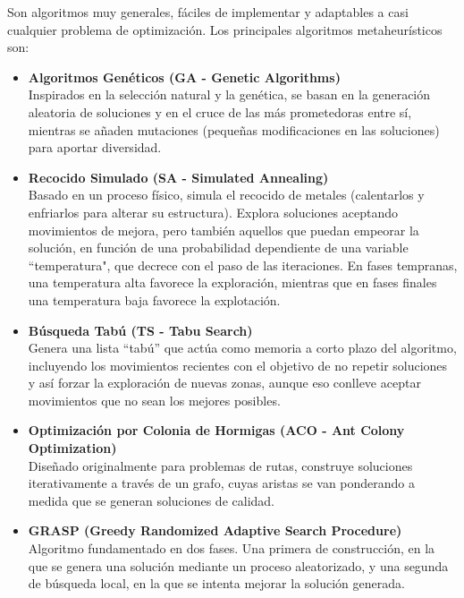 \documentclass[12pt,a4paper]{book}
\begin{document}
Son algoritmos muy generales, fáciles de implementar y adaptables a casi 
cualquier problema de optimización. Los principales algoritmos metaheurísticos son:
\begin{itemize}
    \item \textbf{Algoritmos Genéticos (GA - Genetic Algorithms)}\\
    Inspirados en la selección natural y la genética, se basan en la generación aleatoria de soluciones y en el cruce de las más prometedoras entre sí, 
    mientras se añaden mutaciones (pequeñas modificaciones en las soluciones) para aportar diversidad.
    
    \item \textbf{Recocido Simulado (SA - Simulated Annealing)}\\
    Basado en un proceso físico, simula el recocido de metales (calentarlos y enfriarlos para alterar su estructura). Explora soluciones aceptando movimientos de mejora, pero también aquellos que puedan empeorar la solución, 
    en función de una probabilidad dependiente de una variable ``temperatura", que decrece con el paso de las iteraciones. En fases tempranas, una temperatura alta favorece la exploración, mientras que en fases finales una temperatura baja favorece la explotación.
    
    \item \textbf{Búsqueda Tabú (TS - Tabu Search)}\\
    Genera una lista ``tabú'' que actúa como memoria a corto plazo del algoritmo, incluyendo los movimientos recientes con el objetivo de no repetir soluciones y así forzar la exploración de nuevas zonas, aunque eso conlleve aceptar movimientos que no sean los mejores posibles.
    
    \item \textbf{Optimización por Colonia de Hormigas (ACO - Ant Colony Optimization)}\\
    Diseñado originalmente para problemas de rutas, construye soluciones iterativamente a través de un grafo, cuyas aristas se van ponderando a medida que se generan soluciones de calidad.
    
    \item \textbf{GRASP (Greedy Randomized Adaptive Search Procedure)}\\
    Algoritmo fundamentado en dos fases. Una primera de construcción, en la que se genera una solución mediante un proceso aleatorizado, y una segunda de búsqueda local, en la que se intenta mejorar la solución generada.
\end{itemize}
\end{document}
